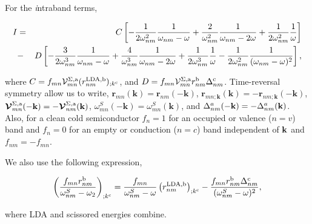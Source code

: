 \documentclass[floatfix,prb,aps,superscriptaddress,11pt,preprint]{revtex4}
\begin{document}
For the {\it i}ntraband terms,

\begin{eqnarray}\label{pfi} 
I&=& C\left[-\frac{1}{2\omega^2_{nm}}\frac{1}{\omega_{nm}-\omega}+\frac{2}{\omega^2_{nm}}\frac{1}{\omega_{nm}-2\omega}+\frac{1}{2\omega^2_{nm}}\frac{1}{\omega}\right]\nonumber\\
&-&D\left[-\frac{3}{2\omega^3_{nm}}\frac{1}{\omega_{nm}-\omega}+\frac{4}{\omega^3_{nm}}\frac{1}{\omega_{nm}-2\omega}+\frac{1}{2\omega^3_{nm}}\frac{1}{\omega}-\frac{1}{2\omega^2_{nm}}\frac{1}{(\omega_{nm}-\omega)^2}\right],
\end{eqnarray} 

where $C=f_{mn}{\cal V}^{\Sigma,\mathrm{a}}_{mn}(r^{\mathrm{LDA},\mathrm{b}}_{nm})_{;k^{\mathrm{c}}}$, and $D=f_{mn}{\cal V}^{\Sigma,\mathrm{a}}_{mn}r^{\mathrm{b}}_{nm}\Delta^{\mathrm{c}}_{nm}$. Time-reversal symmetry allow us to write, $\mathbf{r}_{mn}(\mathbf{k})=\mathbf{r}_{nm}(-\mathbf{k})$, $\mathbf{r}_{mn;\mathbf{k}}(\mathbf{k})=-\mathbf{r}_{nm;\mathbf{k}}(-\mathbf{k})$, $\boldsymbol{\mathcal{\cal V}}_{mn}^{\Sigma,\mathrm{a}}(-\mathbf{k})=-\boldsymbol{\mathcal{\cal V}}_{nm}^{\Sigma,\mathrm{a}}(\mathbf{k})$, $\omega_{mn}^{S}(-\mathbf{k})=\omega_{mn}^{S}(\mathbf{k})$, and $\Delta^a_{nm}(-\mathbf{k})=-\Delta^a_{nm}(\mathbf{k})$. Also, for a clean cold semiconductor $f_n=1$  for an occupied or valence ($n=v$) band and $f_n=0$ for an empty or conduction ($n=c$) band independent of $\mathbf{k}$ and $f_{nm}=-f_{mn}$.

We also use the following expression,

\begin{equation}\label{gene2}
\left(\frac{f_{mn}r_{nm}^{\mathrm{b}}}{\omega^S_{nm}-\omega_2}\right)_{;k^{\mathrm{c}}}=\frac{f_{mn}}{\omega^S_{nm}-\omega}\left(r_{nm}^{\mathrm{LDA},\mathrm{b}}\right)_{;k^{\mathrm{c}}}-\frac{f_{mn}r_{nm}^{\mathrm{b}}\Delta_{nm}^{\mathrm{c}}}{(\omega^S_{nm}-\omega)^2},
\end{equation}

where LDA and scissored energies combine.
\end{document}
